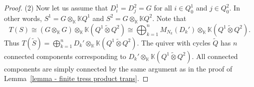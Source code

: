 \documentclass[a4paper, reqno]{amsart}
\theoremstyle{definition}
\newtheorem{myrem}[mythm]{Remark}
\newcommand{\K}{\mathbb{K}}
\begin{document}
\begin{proof}
	(2) Now let us assume that $D_i^1 = D_j^2 = G$ for all $i\in Q_0^1$ and $j\in Q_0^2$. In other words, $S^1 = G \otimes_\K \K Q^1$ and $S^2= G \otimes_\K \K Q^2$. Note that
	\begin{equation*}
		T(S)\cong (G\otimes_\K G)\otimes_\K \K (Q^1\tilde{\otimes} Q^2) \cong \bigoplus_{k=1}^n M_{N_k}(D_k')\otimes_\K \K (Q^1\tilde{\otimes} Q^2).
	\end{equation*}
	Thus $T(\tilde{S}) = \bigoplus_{k=1}^n D_k'\otimes_\K \K (Q^1\tilde{\otimes} Q^2)$. The quiver with cycles $\tilde{Q}$ has $n$ connected components corresponding to $D_k'\otimes_\K \K (Q^1\tilde{\otimes} Q^2)$. All connected components are simply connected by the same argument as in the proof of Lemma~\ref{lemma - finite tress product trans}.
\end{proof}

\end{document}
